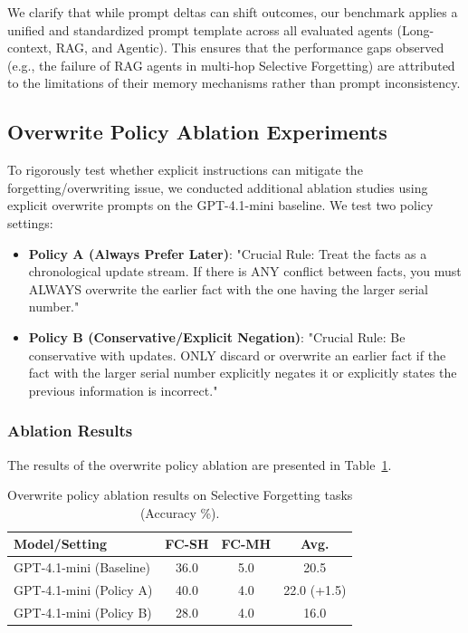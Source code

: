 We clarify that while prompt deltas can shift outcomes, our benchmark applies a unified and standardized prompt template across all evaluated agents (Long-context, RAG, and Agentic). This ensures that the performance gaps observed (e.g., the failure of RAG agents in multi-hop Selective Forgetting) are attributed to the limitations of their memory mechanisms rather than prompt inconsistency.

\subsection{Overwrite Policy Ablation Experiments}
To rigorously test whether explicit instructions can mitigate the forgetting/overwriting issue, we conducted additional ablation studies using explicit overwrite prompts on the GPT-4.1-mini baseline. We test two policy settings:
\begin{itemize}
    \item \textbf{Policy A (Always Prefer Later)}: "Crucial Rule: Treat the facts as a chronological update stream. If there is ANY conflict between facts, you must ALWAYS overwrite the earlier fact with the one having the larger serial number."
    \item \textbf{Policy B (Conservative/Explicit Negation)}: "Crucial Rule: Be conservative with updates. ONLY discard or overwrite an earlier fact if the fact with the larger serial number explicitly negates it or explicitly states the previous information is incorrect."
\end{itemize}

\subsubsection{Ablation Results}
The results of the overwrite policy ablation are presented in Table~\ref{tab:overwrite_policy}.
\begin{table}[h!]
\centering
\begin{tabular}{lccc}
\toprule
Model/Setting & FC-SH & FC-MH & Avg. \\
\midrule
GPT-4.1-mini (Baseline) & 36.0 & 5.0 & 20.5 \\
GPT-4.1-mini (Policy A) & 40.0 & 4.0 & 22.0 (+1.5) \\
GPT-4.1-mini (Policy B) & 28.0 & 4.0 & 16.0 \\
\bottomrule
\end{tabular}
\caption{Overwrite policy ablation results on Selective Forgetting tasks (Accuracy \%).}
\label{tab:overwrite_policy}
\end{table}

